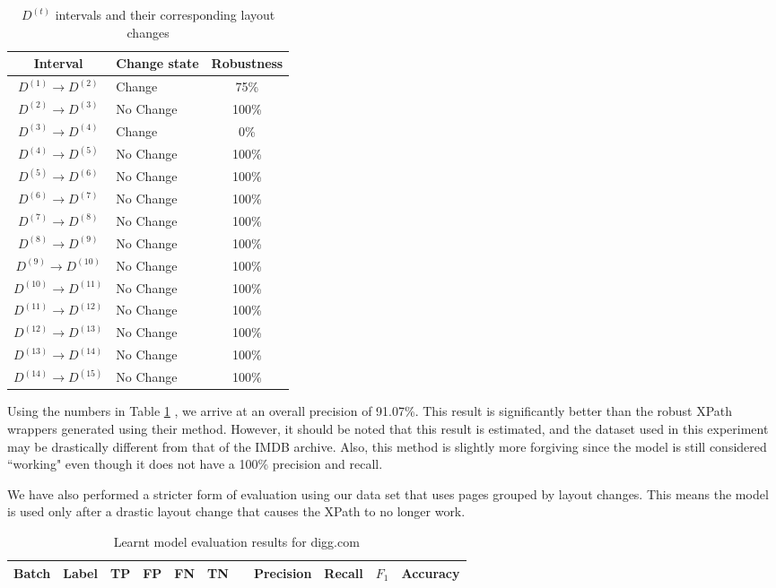 \begin{table}
\centering
\small
\singlespacing
\begin{tabular}{|c|l|c|}
\hline
	Interval			  & Change state & Robustness\\
\hline
	$D^{(1)} \to D^{(2)}$ & Change		& 75\%\\
	$D^{(2)} \to D^{(3)}$ & No Change 	& 100\%\\
	$D^{(3)} \to D^{(4)}$ & Change 		& 0\%\\
	$D^{(4)} \to D^{(5)}$ & No Change 	& 100\%\\
	$D^{(5)} \to D^{(6)}$ & No Change 	& 100\%\\
	$D^{(6)} \to D^{(7)}$ & No Change 	& 100\%\\
	$D^{(7)} \to D^{(8)}$ & No Change 	& 100\%\\
	$D^{(8)} \to D^{(9)}$ & No Change 	& 100\%\\
	$D^{(9)} \to D^{(10)}$ & No Change 	& 100\%\\
	$D^{(10)} \to D^{(11)}$ & No Change 	& 100\%\\
	$D^{(11)} \to D^{(12)}$ & No Change 	& 100\%\\
	$D^{(12)} \to D^{(13)}$ & No Change 	& 100\%\\
	$D^{(13)} \to D^{(14)}$ & No Change 	& 100\%\\
	$D^{(14)} \to D^{(15)}$ & No Change 	& 100\%\\
\hline 
\end{tabular}
\caption{$D^{(t)}$ intervals and their corresponding layout changes}
\label{tab:dalvicomp}
\end{table}

Using the numbers in Table \ref{tab:dalvicomp} , we arrive at an overall precision of 91.07\%. This result
is significantly better than the robust XPath wrappers generated using their method. However,
it should be noted that this result is estimated, and the dataset used in this experiment may
be drastically different from that of the IMDB archive. Also, this method is slightly more forgiving
since the model is still considered ``working" even though it does not have a 100\% precision
and recall.

We have also performed a stricter form of evaluation using our data set that uses pages
grouped by layout changes. This means the model is used only after a drastic layout change
that causes the XPath to no longer work.

\begin{table}
\centering
\small
\singlespacing
\begin{tabular}{|c|l|c|c|c|c|c|c|c|c|c|}
\hline
Batch	&Label	&TP	&FP	&FN	&TN	&	&Precision	&Recall& $F_1$ & Accuracy\\
\hline

\hline 
\end{tabular}
\caption{Learnt model evaluation results for digg.com}
\label{tab:mlevalres}
\end{table}


